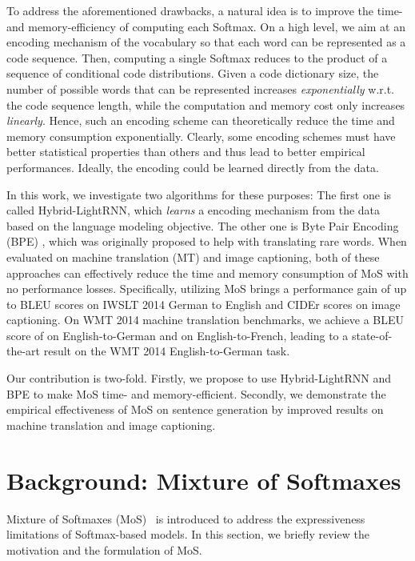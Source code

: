 \documentclass[letterpaper]{article} \usepackage{aaai19}  \usepackage{times}  \usepackage{helvet}  \usepackage{courier}  \usepackage{url}  \usepackage{graphicx}  \frenchspacing  \usepackage{booktabs}
\begin{document}
To address the aforementioned drawbacks, a natural idea is to improve the time- and memory-efficiency of computing each Softmax.
On a high level, we aim at an encoding mechanism of the vocabulary so that each word can be represented as a code sequence.
Then, computing a single Softmax reduces to the product of a sequence of conditional code distributions.
Given a code dictionary size, the number of possible words that can be represented increases \textit{exponentially} w.r.t. the code sequence length, while the computation and memory cost 
only increases \textit{linearly}.
Hence, such an encoding scheme can theoretically reduce the time and memory consumption exponentially. 
Clearly, some encoding schemes must have better statistical properties than others and thus lead to better empirical performances.
Ideally, the encoding could be learned directly from the data. 

In this work, we investigate two algorithms for these purposes: 
The first one is called Hybrid-LightRNN, which \textit{learns} a encoding mechanism from the data based on the language modeling objective.
The other one is Byte Pair Encoding (BPE) \cite{gage1994new,sennrich2016neural}, which was originally proposed to help with translating rare words. 
When evaluated on machine translation (MT) and image captioning, both of these approaches can effectively reduce the time and memory consumption of MoS with no performance losses. 
Specifically, utilizing MoS brings a performance gain of up to  BLEU scores on IWSLT 2014 German to English and  CIDEr scores on image captioning. 
On WMT 2014 machine translation benchmarks, we achieve a BLEU score of  on English-to-German and  on English-to-French, leading to a state-of-the-art result on the WMT 2014 English-to-German task.

Our contribution is two-fold. Firstly, we propose to use Hybrid-LightRNN and BPE to make MoS time- and memory-efficient. Secondly, we demonstrate the empirical effectiveness of MoS on sentence generation by improved results on machine translation and image captioning. 

\section{Background: Mixture of Softmaxes}
Mixture of Softmaxes (MoS)~\cite{yang2017breaking} is introduced to address the expressiveness limitations of Softmax-based models. In this section, we briefly review the motivation and the formulation of MoS. 
\end{document}
